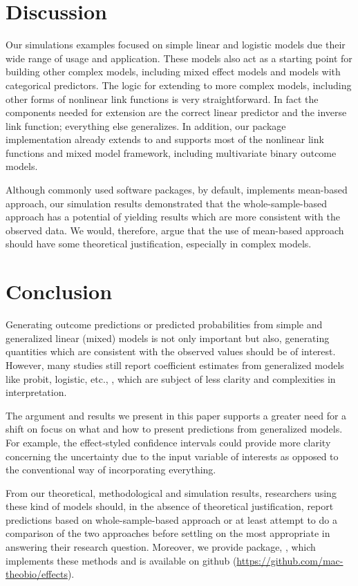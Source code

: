 \section{Discussion}

Our simulations examples focused on simple linear and logistic models due their wide range of usage and application. These models also act as a starting point for building other complex models, including mixed effect models and models with categorical predictors. The logic for extending to more complex models, including other forms of nonlinear link functions is very straightforward. In fact the components needed for extension are the correct linear predictor and the inverse link function; everything else generalizes. In addition, our  package implementation already extends to and supports most of the nonlinear link functions and mixed model framework, including multivariate binary outcome models.

Although commonly used  software packages, by default, implements mean-based approach, our simulation results demonstrated that the whole-sample-based approach has a potential of yielding results which are more consistent with the observed data. We would, therefore, argue that the use of mean-based approach should have some theoretical justification, especially in complex models. 

\section{Conclusion}

Generating outcome predictions or predicted probabilities from simple and generalized linear (mixed) models is not only important but also, generating quantities which are consistent with the observed values should be of interest. However, many studies still report coefficient estimates from generalized models like probit, logistic, etc., \citep{hanmer2013behind}, which are subject of less clarity and complexities in interpretation.

The argument and results we present in this paper supports a greater need for a shift on focus on what and how to present predictions from generalized models. For example, the effect-styled confidence intervals could provide more clarity concerning the uncertainty due to the input variable of interests as opposed to the conventional way of incorporating everything. 

From our theoretical, methodological and simulation results, researchers using these kind of models should, in the absence of theoretical justification, report predictions based on whole-sample-based approach or at least attempt to do a comparison of the two approaches before settling on the most appropriate in answering their research question. Moreover, we provide  package, , which implements these methods and is available on github (\href{https://github.com/mac-theobio/effects}{https://github.com/mac-theobio/effects}).


